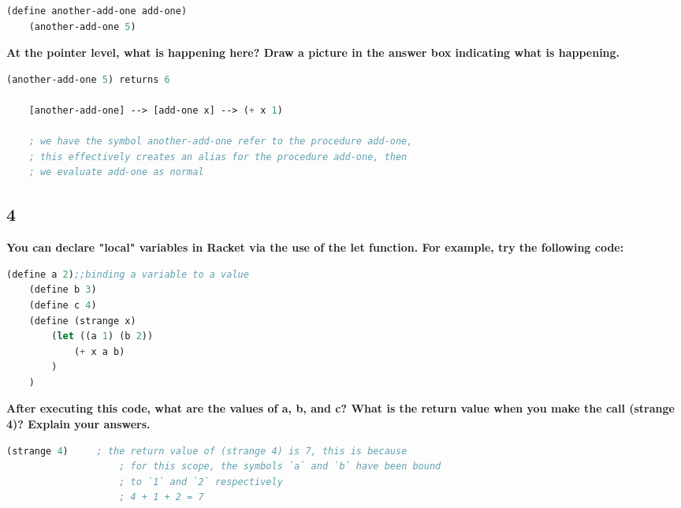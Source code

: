 \documentclass{article}
\begin{document}
\begin{lstlisting}[language=lisp]
    (define another-add-one add-one) 
    (another-add-one 5) 
\end{lstlisting}

\begin{adjustwidth}{2em}{0em}
    \textbf{At the pointer level, what is happening here? Draw a picture in the answer box indicating what is happening.}
\end{adjustwidth}

\begin{lstlisting}[language=lisp,style=redStyle]
    (another-add-one 5) returns 6

    [another-add-one] --> [add-one x] --> (+ x 1)

    ; we have the symbol another-add-one refer to the procedure add-one, 
    ; this effectively creates an alias for the procedure add-one, then
    ; we evaluate add-one as normal
\end{lstlisting}

\subsection*{4}
\begin{adjustwidth}{2em}{0em}
    \textbf{You can declare "local" variables in Racket via the use of the let function. For example, try the following code: }
\end{adjustwidth}

\begin{lstlisting}[language=lisp]
    (define a 2);;binding a variable to a value 
    (define b 3) 
    (define c 4) 
    (define (strange x) 
        (let ((a 1) (b 2)) 
            (+ x a b)
        )
    ) 
\end{lstlisting}

\begin{adjustwidth}{2em}{0em}
    \textbf{After executing this code, what are the values of a, b, and c? What is the return value when you make the call (strange 4)? Explain your answers.}
\end{adjustwidth}

\begin{lstlisting}[language=lisp,style=redStyle]
    (strange 4)     ; the return value of (strange 4) is 7, this is because
                    ; for this scope, the symbols `a` and `b` have been bound
                    ; to `1` and `2` respectively
                    ; 4 + 1 + 2 = 7 
\end{lstlisting}
\end{document}
